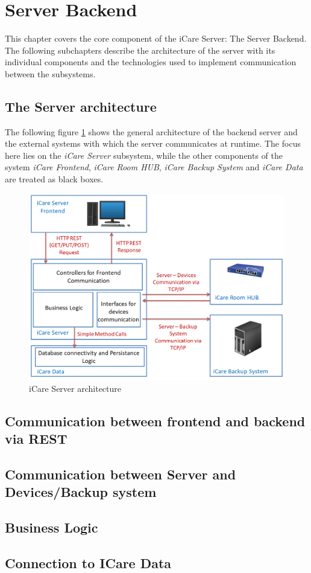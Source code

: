 \section{Server Backend}
This chapter covers the core component of the iCare Server: The Server Backend. The following subchapters describe the architecture of the server with its individual components and the technologies used to implement communication between the subsystems.
\subsection{The Server architecture}
The following figure \ref{icare-serverarchitecure} shows the general architecture of the backend server and the external systems with which the server communicates at runtime. The focus here lies on the \textit{iCare Server} subsystem, while the other components of the system \textit{iCare Frontend}, \textit{iCare Room HUB}, \textit{iCare Backup System} and \textit{iCare Data} are treated as black boxes. 
\begin{figure}[H]
	\centering
	\includegraphics[width =1.0\textwidth]{images/server-architecture.PNG}
	\caption{iCare Server architecture}
	\label{icare-serverarchitecure}
\end{figure}
\subsection{Communication between frontend and backend via REST}
\subsection{Communication between Server and Devices/Backup system}
\subsection{Business Logic}
\subsection{Connection to ICare Data}